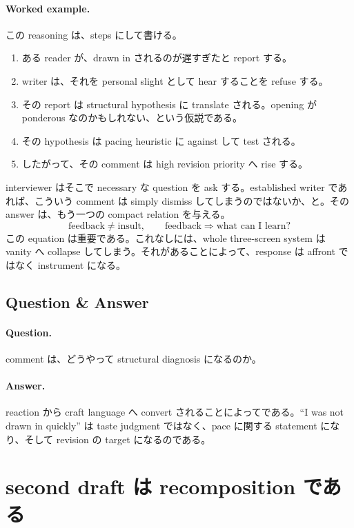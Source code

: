 \paragraph{Worked example.} この reasoning は、steps にして書ける。
\begin{enumerate}
\item ある reader が、drawn in されるのが遅すぎたと report する。
\item writer は、それを personal slight として hear することを refuse する。
\item その report は structural hypothesis に translate される。opening が ponderous なのかもしれない、という仮説である。
\item その hypothesis は pacing heuristic に against して test される。
\item したがって、その comment は high revision priority へ rise する。
\end{enumerate}

interviewer はそこで necessary な question を ask する。established writer であれば、こういう comment は simply dismiss してしまうのではないか、と。その answer は、もう一つの compact relation を与える。
\begin{equation}
\text{feedback} \neq \text{insult}, \qquad
\text{feedback} \Rightarrow \text{what can I learn?}
\end{equation}
この equation は重要である。これなしには、whole three-screen system は vanity へ collapse してしまう。それがあることによって、response は affront ではなく instrument になる。

\subsection{Question \& Answer}

\paragraph{Question.} comment は、どうやって structural diagnosis になるのか。

\paragraph{Answer.} reaction から craft language へ convert されることによってである。``I was not drawn in quickly'' は taste judgment ではなく、pace に関する statement になり、そして revision の target になるのである。

\section{second draft は recomposition である}

